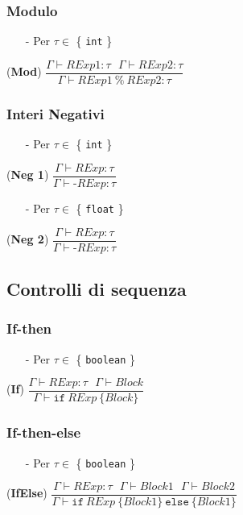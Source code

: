 \documentclass[12pt]{article}
\begin{document}
\subsubsection*{Modulo}
\begin{center}
\begin{itemize}
\item[-] Per $\tau \in$ \{ \texttt{int} \}
\end{itemize}
\noindent(\textbf{Mod})
$\dfrac{\Gamma \vdash RExp1:\tau\ \ \ \Gamma \vdash RExp2:\tau}{\Gamma \vdash RExp1\ \texttt{\%}\ RExp2:\tau}$
\end{center}
\subsubsection*{Interi Negativi}

\begin{center}
\begin{itemize}
\item[-] Per $\tau \in$ \{ \texttt{int} \}
\end{itemize}
\noindent(\textbf{Neg 1})
$\dfrac{\Gamma \vdash RExp:\tau}{\Gamma \vdash \texttt{-}RExp:\tau}$\\[0.1in]
\begin{itemize}
\item[-] Per $\tau \in$ \{ \texttt{float} \}
\end{itemize}
\noindent(\textbf{Neg 2})
$\dfrac{\Gamma \vdash RExp:\tau}{\Gamma \vdash \texttt{-}RExp:\tau}$
\end{center}

\subsection*{Controlli di sequenza}


\subsubsection*{If-then}
\begin{center}
\begin{itemize}
\item[-] Per $\tau \in$ \{ \texttt{boolean} \}
\end{itemize}
\noindent(\textbf{If})
$\dfrac{\Gamma \vdash RExp:\tau\ \ \ \Gamma \vdash Block}{\Gamma \vdash \texttt{if}\ RExp\ \{ Block\}}$\\[0.1in]
\end{center}

\subsubsection*{If-then-else}
\begin{center}
\begin{itemize}
\item[-] Per $\tau \in$ \{ \texttt{boolean} \}
\end{itemize}
\noindent(\textbf{IfElse})
$\dfrac{\Gamma \vdash RExp:\tau\ \ \ \Gamma \vdash Block1\ \ \ \Gamma \vdash Block2}{\Gamma \vdash \texttt{if}\ RExp\ \{ Block1\}\ \texttt{else}\ \{ Block1\}}$\\[0.1in]
\end{center}
\end{document}

